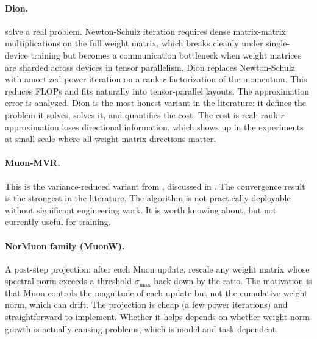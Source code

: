 \documentclass[11pt]{article}
\begin{document}
\paragraph{Dion.}
\citet{ahn2025dion} solve a real problem. Newton-Schulz iteration requires dense matrix-matrix multiplications on the full weight matrix, which breaks cleanly under single-device training but becomes a communication bottleneck when weight matrices are sharded across devices in tensor parallelism. Dion replaces Newton-Schulz with amortized power iteration on a rank-$r$ factorization of the momentum. This reduces FLOPs and fits naturally into tensor-parallel layouts. The approximation error is analyzed. Dion is the most honest variant in the literature: it defines the problem it solves, solves it, and quantifies the cost. The cost is real: rank-$r$ approximation loses directional information, which shows up in the experiments at small scale where all weight matrix directions matter.

\paragraph{Muon-MVR.}
This is the variance-reduced variant from \citet{chang2025beyond}, discussed in . The convergence result is the strongest in the literature. The algorithm is not practically deployable without significant engineering work. It is worth knowing about, but not currently useful for training.

\paragraph{NorMuon family (MuonW).}
A post-step projection: after each Muon update, rescale any weight matrix whose spectral norm exceeds a threshold $\sigma_{\max}$ back down by the ratio. The motivation is that Muon controls the magnitude of each update but not the cumulative weight norm, which can drift. The projection is cheap (a few power iterations) and straightforward to implement. Whether it helps depends on whether weight norm growth is actually causing problems, which is model and task dependent.
\end{document}
